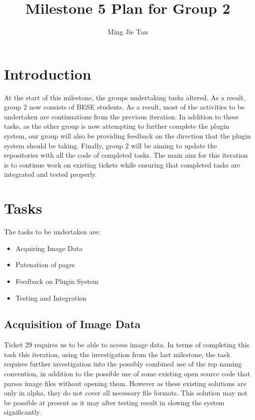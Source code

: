 \documentclass{article}
\begin{document}
\title{\textbf{Milestone 5 Plan for Group 2}}\author{Ming Jie Tan}

\maketitle
\thispagestyle{empty}
\newpage{}

\thispagestyle{empty}
\tableofcontents
\newpage{}

\setcounter{page}{1}
\section{Introduction}

At the start of this milestone, the groups undertaking tasks altered. As a result, group 2 now consists of BESE students. As a result, most of the activities to be undertaken are continuations from the previous iteration. In addition to these tasks, as the other group is now attempting to further complete the plugin system, our group will also be providing feedback on the direction that the plugin system should be taking. Finally, group 2 will be aiming to update the repositories with all the code of completed tasks. 
The main aim for this iteration is to continue work on existing tickets while ensuring that completed tasks are integrated and tested properly.

\newpage{}
\section{Tasks}

The tasks to be undertaken are:
\begin{itemize}
	\item Acquiring Image Data
	\item Patenation of pages
	\item Feedback on Plugin System
	\item Testing and Integration
\end{itemize}

\subsection{Acquisition of Image Data}

Ticket 29 requires us to be able to access image data. In terms of completing this task this iteration, using the investigation from the last milestone, the task requires further investigation into the possibly combined use of the rsp naming convention, in addition to the possible use of some existing open source code that parses image files without opening them. However as these existing solutions are only in alpha, they do not cover all necessary file formats. This solution may not be possible at present as it may after testing result in slowing the system significantly.
\end{document}
